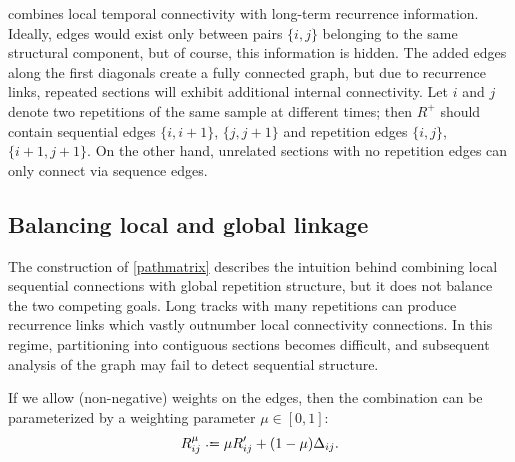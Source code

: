 \documentclass{article}
\begin{document}
 combines local temporal connectivity with long-term
recurrence information.  Ideally, edges would exist only between pairs $\{i,j\}$
belonging to the same structural component, but of course, this information is hidden.  
The added edges along the first diagonals create a fully connected graph, but due to
recurrence links, repeated sections will exhibit additional internal connectivity.  
Let $i$ and $j$ denote two repetitions of the same sample at different times; then $R^+$ 
should contain sequential edges $\{i, i+1\}$, $\{j, j+1\}$ and repetition edges $\{i,
j\}$, $\{i+1, j+1\}$. On the other hand, unrelated sections with no repetition edges
can only connect via sequence edges.


\subsection{Balancing local and global linkage}
The construction of \cref{pathmatrix} describes the intuition behind combining
local sequential connections with global repetition structure, but it does not balance the 
two competing goals.  Long tracks with many repetitions can produce recurrence links which 
vastly outnumber local connectivity connections.
In this regime, partitioning into contiguous sections becomes difficult, and subsequent 
analysis of the graph may fail to detect sequential structure.

If we allow (non-negative) weights on the edges, then the combination can be parameterized 
by a weighting parameter $\mu \in [0, 1]$:
\begin{equation}
R_{ij}^\mu \defeq \mu R_{ij}' + (1 - \mu) \Delta_{ij}. \label{weightedsum}
\end{equation}
\end{document}
